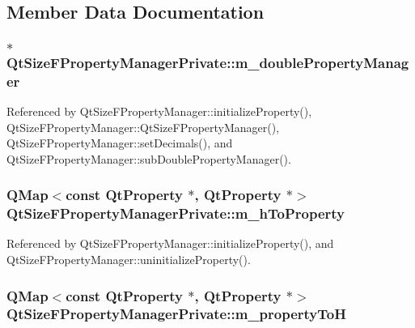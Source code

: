 \subsection{Member Data Documentation}
\subsubsection[{m\+\_\+double\+Property\+Manager}]{$\ast$ Qt\+Size\+F\+Property\+Manager\+Private\+::m\+\_\+double\+Property\+Manager}\label{classQtSizeFPropertyManagerPrivate_a00b17f5677026ad4bd87db165565eb06}


Referenced by Qt\+Size\+F\+Property\+Manager\+::initialize\+Property(), Qt\+Size\+F\+Property\+Manager\+::\+Qt\+Size\+F\+Property\+Manager(), Qt\+Size\+F\+Property\+Manager\+::set\+Decimals(), and Qt\+Size\+F\+Property\+Manager\+::sub\+Double\+Property\+Manager().

\subsubsection[{m\+\_\+h\+To\+Property}]{\setlength{\rightskip}{0pt plus 5cm}Q\+Map$<$const {\bf Qt\+Property} $\ast$, {\bf Qt\+Property} $\ast$$>$ Qt\+Size\+F\+Property\+Manager\+Private\+::m\+\_\+h\+To\+Property}\label{classQtSizeFPropertyManagerPrivate_a9c7a73ba9d4af387d1358cf8f177aff7}


Referenced by Qt\+Size\+F\+Property\+Manager\+::initialize\+Property(), and Qt\+Size\+F\+Property\+Manager\+::uninitialize\+Property().

\subsubsection[{m\+\_\+property\+ToH}]{\setlength{\rightskip}{0pt plus 5cm}Q\+Map$<$const {\bf Qt\+Property} $\ast$, {\bf Qt\+Property} $\ast$$>$ Qt\+Size\+F\+Property\+Manager\+Private\+::m\+\_\+property\+ToH}\label{classQtSizeFPropertyManagerPrivate_ab7f883a34a164c1b42fdbdff4a385deb}


